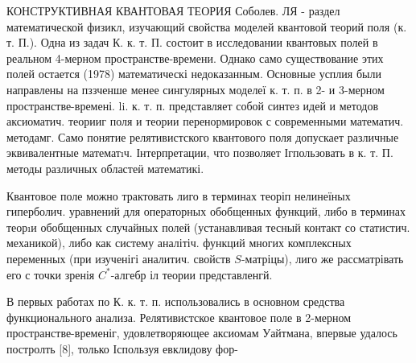 \documentclass[10pt]{article}
\begin{document}
КОНСТРУКТИВНАЯ КВАНТОВАЯ ТЕОРИЯ Соболев. ЛЯ - раздел математической физикл, изучающий свойства моделей квантовой теорий поля (к. т. П.). Одна из задач К. к. т. П. состоит в исследовании квантовых полей в реальном 4-мерном пространстве-времени. Однако само существование этих полей остается (1978) математическі недоказанным. Основные усплия были направлены на пззченше менее сингулярных моделеї к. т. п. в 2- и 3-мерном пространстве-времені. li. к. т. п. представляет собой синтез идей и методов аксиоматич. теорииг поля и теории перенормировок с современными математич. методамг. Само понятие релятивистского квантового поля допускает различные эквивалентные математıч. Інтерпретации, что позволяет Ігпользовать в к. т. П. методы различных областеӥ математикі.



Квантовое поле можно трактовать лиго в терминах теоріп нелинеїных гиперболич. уравнений для операторных обобщенных функций, либо в терминах теорıи обобщенных случайных полей (устанавливая тесный контакт со статистич. механикой), либо как систему аналітіч. функций многих комплексных переменных (при изученігі аналитич. свойств $S$-матріцы), лиго же рассматрівать его с точки зренія $C^{*}$-алгебр іл теории представленгй.



В первых работах по К. к. т. п. использовались в основном средства функционального анализа. Релятивистское квантовое поле в 2-мерном пространстве-временіг, удовлетворяющее аксиомам Уайтмана, впервые удалось постролть [8], только Іспользуя евклидову фор-
\end{document}
